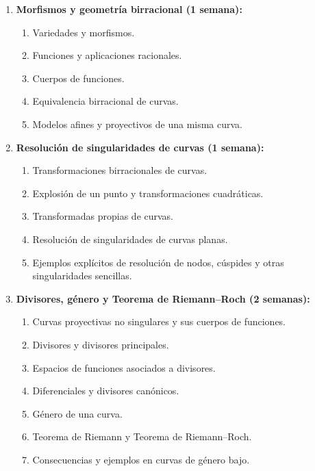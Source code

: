 \begin{refsection}
\begin{enumerate}
\item \textbf{Morfismos y geometría birracional (1 semana):}
\begin{enumerate}
\item Variedades y morfismos.
\item Funciones y aplicaciones racionales.
\item Cuerpos de funciones.
\item Equivalencia birracional de curvas.
\item Modelos afines y proyectivos de una misma curva.
\end{enumerate}

\item \textbf{Resolución de singularidades de curvas (1 semana):}
\begin{enumerate}
\item Transformaciones birracionales de curvas.
\item Explosión de un punto y transformaciones cuadráticas.
\item Transformadas propias de curvas.
\item Resolución de singularidades de curvas planas.
\item Ejemplos explícitos de resolución de nodos, cúspides y otras singularidades sencillas.
\end{enumerate}

\item \textbf{Divisores, género y Teorema de Riemann--Roch (2 semanas):}
\begin{enumerate}
\item Curvas proyectivas no singulares y sus cuerpos de funciones.
\item Divisores y divisores principales.
\item Espacios de funciones asociados a divisores.
\item Diferenciales y divisores canónicos.
\item Género de una curva.
\item Teorema de Riemann y Teorema de Riemann--Roch.
\item Consecuencias y ejemplos en curvas de género bajo.
\end{enumerate}


\end{enumerate}
\end{refsection}
